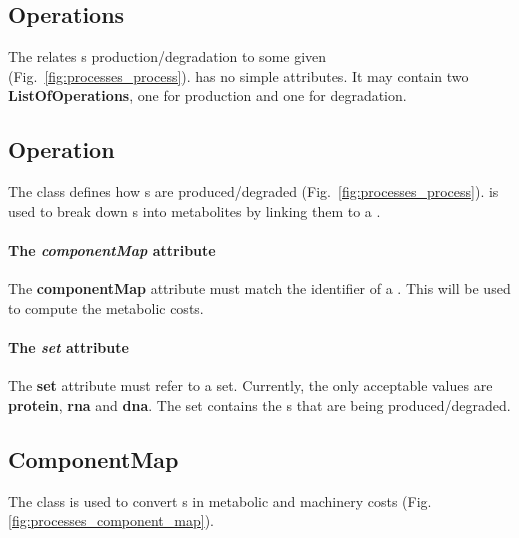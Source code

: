 \subsection{Operations}
\label{sec:operations}

The \operations{} relates \macromolecule{}s production/degradation to
some given \process{} (Fig.~\ref{fig:processes_process}).
\operations{} has no simple attributes.
It may contain two \textbf{ListOfOperations}, one for production and one for
degradation.


\subsection{Operation}
\label{sec:operation}

The \operations{} class defines how \macromolecule{}s are produced/degraded
(Fig.~\ref{fig:processes_process}).
\operation{} is used to break down \macromolecule{}s into metabolites
by linking them to a \componentmap.

\paragraph{The \textit{componentMap} attribute}
The \textbf{componentMap} attribute must match the identifier of a
\componentmap.
This \componentmap{} will be used to compute the metabolic costs.

\paragraph{The \textit{set} attribute}
The \textbf{set} attribute must refer to a \macromolecule{} set.
Currently, the only acceptable values are \textbf{protein}, \textbf{rna}
and \textbf{dna}.
The set contains the \macromolecule{}s that are being produced/degraded.


\subsection{ComponentMap}
\label{sec:component_map}

The \componentmap{} class is used to convert \macromolecule{}s in
metabolic and machinery costs (Fig.\ref{fig:processes_component_map}).

